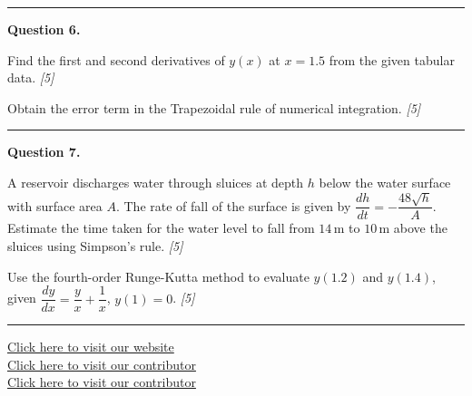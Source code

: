 \documentclass[11pt,a4paper]{article}
\newcommand{\pts}[1]{\hfill   \textit{[#1]}}
\begin{document}
\medskip\rule{\linewidth}{0.2pt}

\medskip


\noindent   \textbf{Question 6.}

\begin{parts}
  \item Find the first and second derivatives of $y(x)$ at $x = 1.5$ from the given tabular data. \pts{5}
  \item Obtain the error term in the Trapezoidal rule of numerical integration. \pts{5}
\end{parts}

\medskip\rule{\linewidth}{0.2pt}

\medskip


\noindent   \textbf{Question 7.}

\begin{parts}
  \item A reservoir discharges water through sluices at depth $h$ below the water surface with surface area $A$. The rate of fall of the surface is given by $\dfrac{dh}{dt} = -\dfrac{48\sqrt{h}}{A}$. Estimate the time taken for the water level to fall from $14\, \text{m}$ to $10\, \text{m}$ above the sluices using Simpson's rule. \pts{5}
  \item Use the fourth-order Runge-Kutta method to evaluate $y(1.2)$ and $y(1.4)$, given $\dfrac{dy}{dx} = \dfrac{y}{x} + \dfrac{1}{x}$, $y(1) = 0$. \pts{5}
\end{parts}

\vfill\rule{\linewidth}{0.4pt}

\begin{center}\small
  \href{https://bhu-exam.vercel.app/}{Click here to visit our website}\\[4pt]
  \href{https://me-aryan.vercel.app/}{Click here to visit our contributor}\\[4pt]
  \href{https://quashan-me.vercel.app/}{Click here to visit our contributor}
\end{center}
\end{document}
